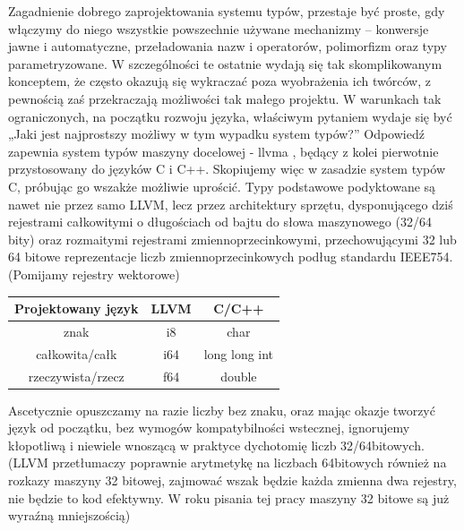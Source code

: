 Zagadnienie dobrego zaprojektowania systemu typów, przestaje być proste, gdy włączymy do niego wszystkie powszechnie używane mechanizmy – konwersje jawne i automatyczne, przeładowania nazw i operatorów, polimorfizm oraz typy parametryzowane. W szczególności te ostatnie wydają się tak skomplikowanym konceptem, że często okazują się wykraczać poza wyobrażenia ich twórców\cite{cpp_templates_turing_complete}\cite{taming_wildcards_java}, z pewnością zaś przekraczają możliwości tak małego projektu.
W warunkach tak ograniczonych, na początku rozwoju języka, właściwym pytaniem wydaje się być „Jaki jest najprostszy możliwy w tym wypadku system typów?” Odpowiedź zapewnia system typów maszyny docelowej - llvma , będący z kolei pierwotnie przystosowany do języków C i C++. Skopiujemy więc w zasadzie system typów C, próbując go wszakże możliwie uprościć.
Typy podstawowe podyktowane są nawet nie przez samo LLVM, lecz przez architektury sprzętu, dysponującego dziś rejestrami całkowitymi o długościach od bajtu do słowa maszynowego (32/64 bity) oraz rozmaitymi rejestrami zmiennoprzecinkowymi, przechowującymi 32 lub 64 bitowe  reprezentacje liczb zmiennoprzecinkowych podług standardu IEEE754. (Pomijamy rejestry wektorowe)
\begin{center}
\begin{tabular}{|c|c|c|}
\hline
\textbf{Projektowany język} & \textbf{LLVM} & \textbf{C/C++} \\ \hline
znak                        & i8       & char               \\ \hline
całkowita/całk              & i64      & long long int      \\ \hline
rzeczywista/rzecz           & f64      & double             \\ \hline
\end{tabular}
\end{center}

Ascetycznie opuszczamy na razie liczby bez znaku, oraz mając okazje tworzyć język od początku, bez wymogów kompatybilności wstecznej, ignorujemy kłopotliwą i niewiele wnoszącą w praktyce dychotomię liczb 32/64bitowych. (LLVM przetłumaczy poprawnie arytmetykę na liczbach 64bitowych również na rozkazy maszyny 32 bitowej, zajmować wszak będzie każda zmienna dwa rejestry, nie będzie to kod efektywny. W roku pisania tej pracy maszyny 32 bitowe są już wyraźną mniejszością)

